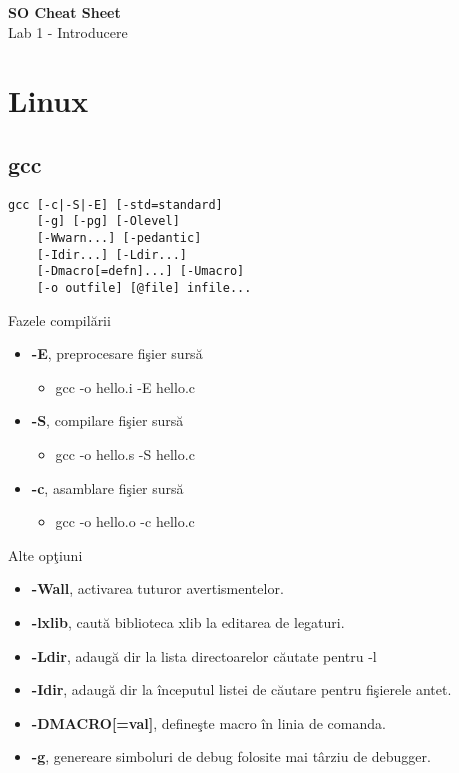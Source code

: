 \documentclass{refcard.cs.pub.ro}
\begin{document}
\raggedright
\footnotesize
\begin{multicols*}{3}

\setlength{\columnseprule}{0.25pt}
\setlength{\premulticols}{1pt}
\setlength{\postmulticols}{1pt}
\setlength{\multicolsep}{1pt}
\setlength{\columnsep}{2pt}

\begin{center}
     \Large{\textbf{SO Cheat Sheet}} \\
     \Large{Lab 1 - Introducere} \\
\end{center}

\section{Linux}

\subsection{gcc}
\begin{verbatim}
gcc [-c|-S|-E] [-std=standard]
    [-g] [-pg] [-Olevel]
    [-Wwarn...] [-pedantic]
    [-Idir...] [-Ldir...]
    [-Dmacro[=defn]...] [-Umacro]
    [-o outfile] [@file] infile...
\end{verbatim}
Fazele compilării
\begin{itemize}
\item \textbf{-E}, preprocesare fişier sursă
\begin{itemize}
\item gcc -o hello.i -E hello.c
\end{itemize}
\item \textbf{-S}, compilare fişier sursă
\begin{itemize}
\item gcc -o hello.s -S hello.c
\end{itemize}
\item \textbf{-c}, asamblare fişier sursă
\begin{itemize}
\item gcc -o hello.o -c hello.c
\end{itemize}
\end{itemize}
Alte opţiuni
\begin{itemize}
\item \textbf{-Wall}, activarea tuturor avertismentelor.
\item \textbf{-lxlib}, caută biblioteca xlib la editarea de legaturi.
\item \textbf{-Ldir}, adaugă dir la lista directoarelor căutate pentru -l
\item \textbf{-Idir}, adaugă dir la începutul listei de căutare pentru fişierele antet.
\item \textbf{-DMACRO[=val]}, defineşte macro în linia de comanda.
\item \textbf{-g}, genereare simboluri de debug folosite mai târziu de debugger. 
\end{itemize}


\end{multicols*}
\end{document}
